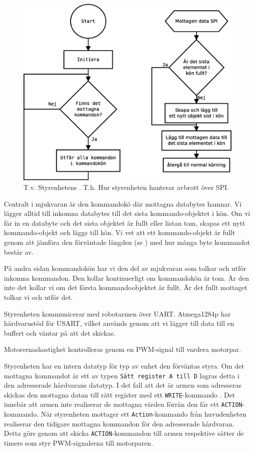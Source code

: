 \begin{figure}[h!]
	\centering
	\includegraphics[scale=0.4]{grafik/styr-mjukvara}
	\caption{T.v. Styrenhetens . T.h. Hur styrenheten hanterar avbrott över SPI.} \label{styr-mjukvara}
\end{figure}

Centralt i mjukvaran är den kommandokö där mottagna databytes hamnar. Vi lägger alltid till inkomna databytes till det sista kommando-objektet i kön. Om vi får in en databyte och det sista objektet är fullt eller listan tom, skapas ett nytt kommando-objekt och läggs till kön. Vi vet att ett kommando-objekt är fullt genom att jämföra den förväntade längden (se ) med hur många byte kommandot består av.

På andra sidan kommandokön har vi den del av mjukvaran som tolkar och utför inkomna kommandon. Den kollar kontinuerligt om kommandokön är tom. Är den inte det kollar vi om det första kommandoobjektet är fullt. Är det fullt mottaget tolkar vi och utför det.

Styrenheten kommunicerar med robotarmen över UART. Atmega1284p har hårdvarustöd för USART, vilket används genom att vi lägger till data till en buffert och väntar på att det skickas.

Motorernashastighet kontrolleras genom en PWM-signal till vardera motorpar. 

Styrenheten har en intern datatyp för typ av enhet den förväntas styra. Om det mottagna kommandot är ett av typen \texttt{Sätt register A till D} lagras detta i den adresserade hårdvarans datatyp. I det fall att det är armen som adresseras skickas den mottagna datan till rätt register med ett \texttt{WRITE}-kommando . Det innebär att armen inte realiserar de mottagna värden förrän den får ett \texttt{ACTION}-kommando. När styrenheten mottager ett \texttt{Action}-kommando från huvudenheten realiserar den tidigare mottagna kommandon för den adresserade hårdvaran. Detta görs genom att skicka \texttt{ACTION}-kommandon till armen respektive sätter de timers som styr PWM-signalerna till motorparen.

